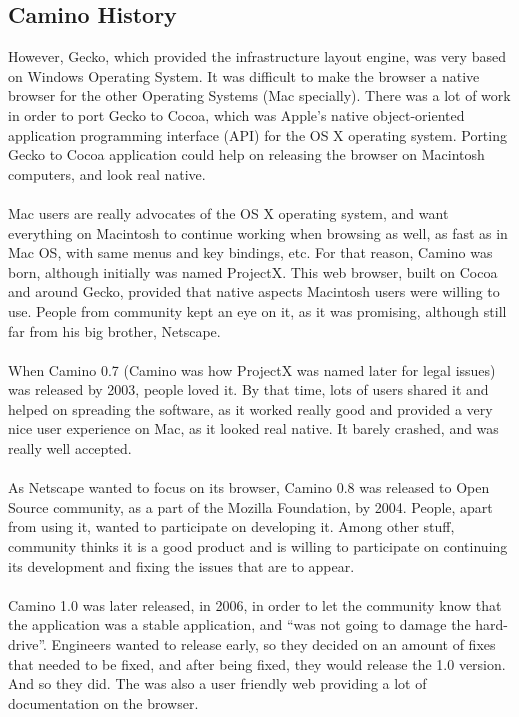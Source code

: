 \documentclass[11pt]{article}
\begin{document}
\subsection{Camino History}
However, Gecko, which provided the infrastructure layout engine, was very based on Windows Operating System. It was difficult to make the browser a native browser for the other Operating Systems (Mac specially). There was a lot of work in order to port Gecko to Cocoa, which was Apple's native object-oriented application programming interface (API) for the OS X operating system. Porting Gecko to Cocoa application could help on releasing the browser on Macintosh computers, and look real native.\\
\\
Mac users are really advocates of the OS X operating system, and want everything on Macintosh to continue working when browsing as well, as fast as in Mac OS, with same menus and key bindings, etc. For that reason, Camino was born, although initially was named ProjectX. This web browser, built on Cocoa and around Gecko, provided that native aspects Macintosh users were willing to use. People from community kept an eye on it, as it was promising, although still far from his big brother, Netscape.\\
\\
When Camino 0.7 (Camino was how ProjectX was named later for legal issues) was released by 2003, people loved it. By that time, lots of users shared it and helped on spreading the software, as it worked really good and provided a very nice user experience on Mac, as it looked real native. It barely crashed, and was really well accepted.\\
\\
As Netscape wanted to focus on its browser, Camino 0.8 was released to Open Source community, as a part of the Mozilla Foundation, by 2004. People, apart from using it, wanted to participate on developing it. Among other stuff, community thinks it is a good product and is willing to participate on continuing its development and fixing the issues that are to appear.\\
\\
Camino 1.0 was later released, in 2006, in order to let the community know that the application was a stable application, and ``was not going to damage the hard-drive''. Engineers wanted to release early, so they decided on an amount of fixes that needed to be fixed, and after being fixed, they would release the 1.0 version. And so they did. The was also a user friendly web providing a lot of documentation on the browser.
\end{document}
